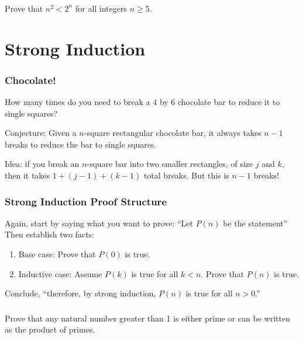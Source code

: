 \documentclass[11pt, compress]{beamer}
\newcommand{\lt}{<}
\newcommand{\gt}{>}
\begin{document}
\begin{frame}
\frametitle{}
\begin{example}[2.5.3]Prove that \(n^2 \lt 2^n\) for all integers \(n \ge 5\).
\end{example}
\end{frame}
 


\section{Strong Induction}
\begin{frame}
\frametitle{Chocolate!}
 How many times do you need to break a 4 by 6 chocolate bar to reduce it to single squares?
 
\pause \vfill 

Conjecture: Given a \(n\)-square rectangular chocolate bar, it always takes \(n-1\) breaks to reduce the bar to single squares.
 
\pause \vfill 

Idea: if you break an \(n\)-square bar into two smaller rectangles, of size \(j\) and \(k\), then it takes \(1 + (j-1) + (k-1)\) total breaks.  But this is \(n-1\) breaks!
\end{frame}
 
\begin{frame}
\frametitle{Strong Induction Proof Structure}
 Again, start by saying what you want to prove: ``Let \(P(n)\) be the statement\textellipsis{}'' Then establish two facts:\begin{enumerate}
\item{} Base case: Prove that \(P(0)\) is true.


\item{} Inductive case: Assume \(P(k)\) is true for all \(k \lt n\). Prove that \(P(n)\) is true.

\end{enumerate}
Conclude, ``therefore, by strong induction, \(P(n)\) is true for all \(n \gt 0\).''
\end{frame}
 
\begin{frame}
\frametitle{}
\begin{example}[2.5.5]Prove that any natural number greater than 1 is either prime or can be written as the product of primes.
\end{example}
\end{frame}
 
\end{document}
